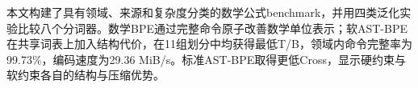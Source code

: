 本文构建了具有领域、来源和复杂度分类的数学公式benchmark，并用四类泛化实验比较八个分词器。数学BPE通过完整命令原子改善数学单位表示；软AST-BPE在共享词表上加入结构代价，在11组划分中均获得最低T/B，领域内命令完整率为99.73\%，编码速度为29.36 MiB/s。标准AST-BPE取得更低Cross，显示硬约束与软约束各自的结构与压缩优势。
